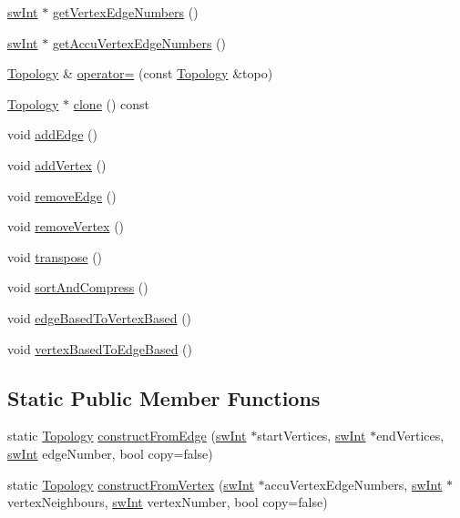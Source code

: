 \begin{DoxyCompactItemize}
\item 
\hyperlink{swMacro_8h_a113cf5f6b5377cdf3fac6aa4e443e9aa}{swInt} $\ast$ \hyperlink{classTopology_aa764ec0eb01782b1da56e7882fbdfa4b}{getVertexEdgeNumbers} ()
\item 
\hyperlink{swMacro_8h_a113cf5f6b5377cdf3fac6aa4e443e9aa}{swInt} $\ast$ \hyperlink{classTopology_aa7c5f72a9b75c9e706495bc02b8b0d00}{getAccuVertexEdgeNumbers} ()
\item 
\hyperlink{classTopology}{Topology} \& \hyperlink{classTopology_aa1e29c8e1c83691efb7eced75d8e085b}{operator=} (const \hyperlink{classTopology}{Topology} \&topo)
\item 
\hyperlink{classTopology}{Topology} $\ast$ \hyperlink{classTopology_a3682f43de839774aea84e68cc8a72c4c}{clone} () const 
\item 
void \hyperlink{classTopology_ab38dc5ab7bd2e7f88e067bc065c5cd94}{addEdge} ()
\item 
void \hyperlink{classTopology_a6675efbf0f6f4298edfd96746ec83ebf}{addVertex} ()
\item 
void \hyperlink{classTopology_a35b065f16c37e1c1be58c51eef36cacd}{removeEdge} ()
\item 
void \hyperlink{classTopology_ac585ff2173a25474b68d6824d3cee325}{removeVertex} ()
\item 
void \hyperlink{classTopology_a27b3fda247b9416dd3558fe8c1c8911e}{transpose} ()
\item 
void \hyperlink{classTopology_a44b957d83b0f281f3c16471db4736041}{sortAndCompress} ()
\item 
void \hyperlink{classTopology_a6d90d44f0630181bfe5dc6b9d4d685a9}{edgeBasedToVertexBased} ()
\item 
void \hyperlink{classTopology_a2b272ddb973a6782dceb068fd3266002}{vertexBasedToEdgeBased} ()
\end{DoxyCompactItemize}
\subsection*{Static Public Member Functions}
\begin{DoxyCompactItemize}
\item 
static \hyperlink{classTopology}{Topology} \hyperlink{classTopology_aa80e5ef0bdfb3a1110b138f67ca2095d}{constructFromEdge} (\hyperlink{swMacro_8h_a113cf5f6b5377cdf3fac6aa4e443e9aa}{swInt} $\ast$startVertices, \hyperlink{swMacro_8h_a113cf5f6b5377cdf3fac6aa4e443e9aa}{swInt} $\ast$endVertices, \hyperlink{swMacro_8h_a113cf5f6b5377cdf3fac6aa4e443e9aa}{swInt} edgeNumber, bool copy=false)
\item 
static \hyperlink{classTopology}{Topology} \hyperlink{classTopology_adda62b196db7dd8bcaa619b4c93f3fa4}{constructFromVertex} (\hyperlink{swMacro_8h_a113cf5f6b5377cdf3fac6aa4e443e9aa}{swInt} $\ast$accuVertexEdgeNumbers, \hyperlink{swMacro_8h_a113cf5f6b5377cdf3fac6aa4e443e9aa}{swInt} $\ast$vertexNeighbours, \hyperlink{swMacro_8h_a113cf5f6b5377cdf3fac6aa4e443e9aa}{swInt} vertexNumber, bool copy=false)
\end{DoxyCompactItemize}
